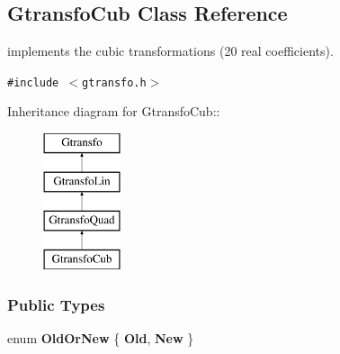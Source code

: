 \subsection{Gtransfo\-Cub  Class Reference}
\label{class_gtransfocub}
implements the cubic transformations (20 real coefficients). 


{\tt \#include $<$gtransfo.h$>$}

Inheritance diagram for Gtransfo\-Cub::\begin{figure}[H]
\begin{center}
\leavevmode
\includegraphics[height=4cm]{class_gtransfocub}
\end{center}
\end{figure}
\subsubsection*{Public Types}
\begin{CompactItemize}
\item 
enum {\bf Old\-Or\-New} \{ {\bf Old}, 
{\bf New}
 \}
\end{CompactItemize}
